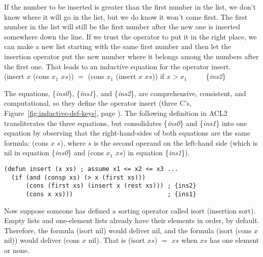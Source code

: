 If the number to be inserted is greater than the first number
in the list, we don't know where it will go in the list,
but we do know it won't come first.
The first number in the list will still be the first number
after the new one is inserted somewhere down the line.
If we trust the operator to put it in the right place,
we can make a new list starting with the same first number
and then  let the insertion operator put the new number
where it belongs among the numbers after the first one.
That leads to an inductive equation for the operator \textsf{insert}.
\vspace{2mm}\\
\hspace*{5mm}\textsf{(insert $x$ (cons $x_1$ $xs$)) $=$ (cons $x_1$ (insert $x$ $xs$))} if $x > x_1$ ~~~~ \{\emph{ins2}\}
\vspace{2mm}

The equations, \{\emph{ins0}\}, \{\emph{ins1}\}, and \{\emph{ins2}\},
are comprehensive, consistent, and computational,
so they define the operator \textsf{insert}
(three C's, Figure~\ref{fig:inductive-def-keys}, page \pageref{fig:inductive-def-keys}).
The following definition in ACL2 transliterates the three equations,
but consolidates \{\emph{ins0}\} and \{\emph{ins1}\} into one equation
by observing that the right-hand-sides of both equations
are the same formula: \textsf{(cons $x$ $s$)}, where $s$ is the second operand
on the left-hand side
(which is \textsf{nil} in equation \{\emph{ins0}\} and
\textsf{(cons $x_1$ $xs$)} in equation \{\emph{ins1}\}).

\label{defun:insert-isort}
\begin{code}
\begin{verbatim}
(defun insert (x xs) ; assume x1 <= x2 <= x3 ...
  (if (and (consp xs) (> x (first xs)))
      (cons (first xs) (insert x (rest xs))) ; {ins2}
      (cons x xs)))                          ; {ins1}
\end{verbatim}
\end{code}

Now suppose someone has defined a sorting operator called \textsf{isort}
(insertion sort).
Empty lists and one-element lists already have their
elements in order, by default.
Therefore, the formula \textsf{(isort nil}) would deliver \textsf{nil},
and the formula \textsf{(isort (cons $x$ nil))} would deliver
\textsf{(cons $x$ nil)}.
That is \textsf{(isort $xs$) $=$ $xs$} when $xs$ has one element or none.

